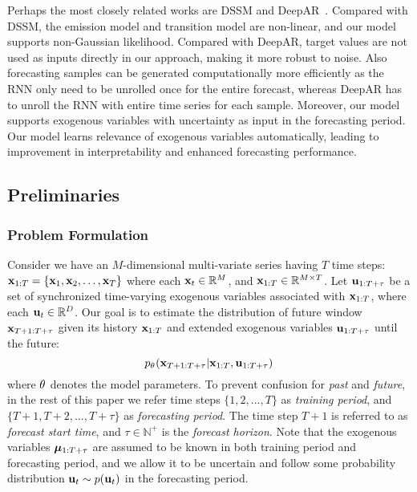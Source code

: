 \documentclass{article}
\begin{document}
Perhaps the most closely related works are  DSSM \cite{rangapuram2018deep} and DeepAR~\cite{flunkert2017deepar}. Compared with DSSM, the emission model and transition model are non-linear, and our model supports non-Gaussian likelihood. Compared with DeepAR, target values are not used as inputs directly in our approach, making it more robust to noise. Also forecasting samples can be generated computationally more efficiently as the RNN only need to be unrolled once for the entire forecast, whereas DeepAR has to unroll the RNN with entire time series for each sample. Moreover, our model supports exogenous variables with uncertainty as input in the forecasting period. Our model learns relevance of exogenous variables automatically, leading to improvement in interpretability and enhanced forecasting performance.

\subsection{Preliminaries}
\subsubsection{Problem Formulation} Consider we have an $M$-dimensional multi-variate series having $T$ time steps: $\mathbf{x}_{1:T} = \{ \mathbf{x}_1, \mathbf{x}_2,\dots,\mathbf{x}_T\}$ where each $\mathbf{x}_t\in \mathbb{R}^M$, and $\mathbf{x}_{1:T} \in \mathbb{R}^{M\times T}$. Let $\mathbf{u}_{1:T+\tau}$ be a set of synchronized time-varying exogenous variables associated with $\mathbf{x}_{1:T}$, where each $\mathbf{u}_t\in\mathbb{R}^{D}$. Our goal is to estimate the distribution of future window $\mathbf{x}_{T+1:T+\tau}$ given its history $\mathbf{x}_{1:T}$ and extended exogenous variables $\mathbf{u}_{1:T+\tau}$ until the future:
\begin{equation}\label{eq:problem}
    p_{\theta_{}}(\mathbf{x}_{T+1:T+\tau}|\mathbf{x}_{1:T},\mathbf{u}_{1:T+\tau})
\end{equation}
where $\theta_{}$ denotes the model parameters. To prevent confusion for \emph{past} and \emph{future}, in the rest of this paper we refer time steps $\{1,2,\dots,T\}$ as \textit{training period}, and $\{T+1,T+2,\dots, T+\tau\}$ as \textit{forecasting period}. The time step $T+1$ is referred to as \textit{forecast start time}, and $\tau\in\mathbb{N}^+$ is the \textit{forecast horizon}. Note that the exogenous variables $\bm{\mu}_{1:T+\tau}$ are assumed to be known in both training period and forecasting period, and we allow it to be uncertain and follow some probability distribution $\mathbf{u}_t\sim p(\mathbf{u}_t)$ in the forecasting period.
\end{document}
